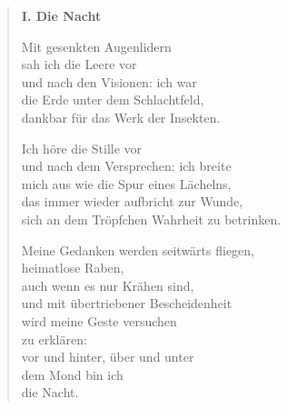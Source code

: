 
\cleartoverso



\begin{verse}

{\bfseries I. Die Nacht}

Mit gesenkten Augenlidern\\
sah ich die Leere vor\\
und nach den Visionen: ich war\\
die Erde unter dem Schlachtfeld,\\
dankbar für das Werk der Insekten.

Ich höre die Stille vor\\
und nach dem Versprechen: ich breite\\
mich aus wie die Spur eines Lächelns,\\
das immer wieder aufbricht zur Wunde,\\
sich an dem Tröpfchen Wahrheit zu betrinken.

Meine Gedanken werden seitwärts fliegen,\\
heimatlose Raben,\\
auch wenn es nur Krähen sind,\\
und mit übertriebener Bescheidenheit\\
wird meine Geste versuchen\\
zu erklären:\\
vor und hinter, über und unter\\
dem Mond bin ich\\
die Nacht.
\end{verse}

\clearpage

\label{yucatan}


